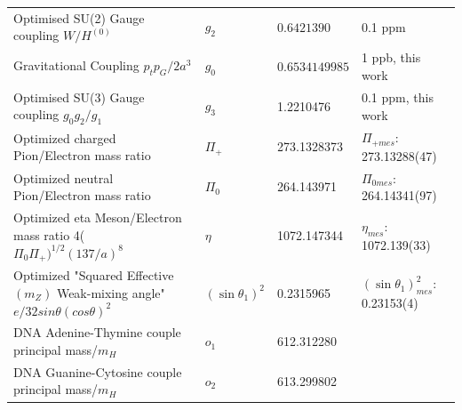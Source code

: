 \documentclass[a4paper,9pt]{article}
\begin{document}
\begin{table}
\begin{tabular}{llll}
  Optimised SU(2) Gauge coupling $W/H^{(0)}$  &  $g_2$  & $0.6421390$ &  0.1 ppm \\ 
 
  Gravitational Coupling $p_tp_G/2a^3$ & $ g_0$  & $ 0.6534149985$ & 1 ppb, this work \\
  
  Optimised SU(3) Gauge coupling $g_0g_2/g_1$  &  $g_3 $ & 1.2210476 & 0.1 ppm, this work\\ 
  
  
  
  Optimized  charged Pion/Electron mass ratio  & $\Pi_+$ & 273.1328373  & $\Pi_{+mes}$: 273.13288(47)  \\     
  Optimized  neutral Pion/Electron mass ratio  & $\Pi_0$ & 264.143971  & $\Pi_{0mes}$: 264.14341(97)\\ 
  Optimized  eta Meson/Electron mass ratio 4($\Pi_0\Pi_+)^{1/2}(137/a)^8$  & $\eta$ & 1072.147344  &  $\eta_{mes}$: 1072.139(33)\\
  Optimized "Squared Effective $(m_Z)$ Weak-mixing angle" $e/ 32 sin \theta  (cos \theta)^2$  & $(\sin \theta_{1})^2$    & 0.2315965 & $(\sin \theta_{1})^2_{mes}$: 0.23153(4) \\
  
 DNA Adenine-Thymine couple principal mass/$m_H$ &  $o_1$   & 612.312280 & \cite{Huang} \\
 DNA Guanine-Cytosine couple principal mass/$m_H$ &  $o_2$   & 613.299802 & \cite{Huang} \\ 
  
  
   
  
   

  
                         

\end{tabular}
\end{table}
\end{document}
